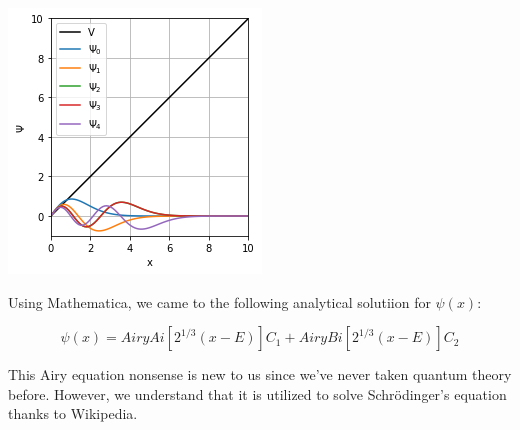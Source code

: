\documentclass[12pt]{article}
\begin{document}
\begin{center}
\includegraphics{psiNormalized.png}
\end{center}

\bigbreak

Using Mathematica, we came to the following analytical solutiion for $\psi(x)$:

\begin{equation}
\psi(x) = AiryAi[2^{1/3}(x-E)]C_{1} + AiryBi[2^{1/3}(x-E)]C_{2}
\end{equation}

This Airy equation nonsense is new to us since we've never taken quantum theory before. However, we understand that it is utilized to solve Schr\"odinger's equation thanks to Wikipedia.
\end{document}
